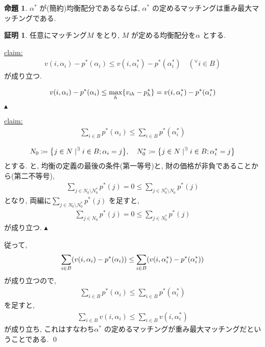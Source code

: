 \documentclass[10pt, fleqn, label-section=none]{bxjsarticle}
\theoremstyle{definition}
\newtheorem{prop}[dfn]{命題}
\newtheorem*{pf*}{証明}
\newcommand{\any}{{}^{\forall}}
\newcommand{\paren}[1]{\mleft( #1\mright )}
\newcommand{\cbra}[1]{\mleft\{#1\mright\}}
\renewcommand{\;}{\, ; \,}
\newenvironment{claim}[1]{\par\noindent\underline{claim:}\space#1}{}
\newenvironment{claimproof}[1]{\par\noindent{($\because$)}\space#1}{\hfill $\blacktriangle $}
\begin{document}
\begin{prop}$\alpha^*$ が(簡約)均衡配分であるならば, $\alpha^*$ の定めるマッチングは重み最大マッチングである. 

\end{prop}
\begin{pf*}
任意にマッチング$M$ をとり, $M$ が定める均衡配分を$\alpha $ とする. 
\begin{claim}
\begin{align*} v(i, \alpha_i) - p^* (\alpha_i)  \leq v(i, \alpha^*_i) - p^* (\alpha^* _i)  \quad (\any i \in B)  \end{align*}
が成り立つ. 
\end{claim}
\begin{claimproof}
\begin{align*} v(i, \alpha_i) - p^* (\alpha _i) \leq \max_h \cbra{v_{ih} - p^*_h } =  v(i, \alpha^*_i) - p^* (\alpha^* _i) \end{align*}
\end{claimproof}

\begin{claim}
\begin{align*} \sum_{i \in B} p^*(\alpha _i )   \leq  \sum_{i \in B} p^*(\alpha^* _i )  \end{align*}
\end{claim}

\begin{claimproof}
\begin{align*} N_0 \coloneqq \cbra{ j \in N \mid ^\exists i \in B ; \alpha_i = j } , \quad N^*_0 \coloneqq \cbra{ j \in N \mid ^\exists i \in B ; \alpha^*_i = j } \end{align*}
とする. と, 均衡の定義の最後の条件(第一等号)と, 財の価格が非負であることから(第二不等号), 
\begin{align*} \sum_{ j \in N_0 \setminus N^*_0 } p^* (j) = 0 \leq  \sum_{ j \in N^*_0 \setminus N_0 } p^* (j)  \end{align*}
となり, 両編に$\displaystyle \sum_{j \in N_0 \setminus N^*_0} p^* (j) $ を足すと, 
\begin{align*}   \sum_{ j \in N_0  } p^* (j) = 0 \leq  \sum_{ j \in N^*_0  } p^* (j)   \end{align*}
が成り立つ. 
\end{claimproof}

従って, 
\begin{align*} \sum_{i \in B} \paren{  v(i, \alpha_i) - p^* (\alpha _i)  }   \leq  \sum_{i \in B}  \paren{ v(i, \alpha^*_i) - p^* (\alpha^* _i)  }  \end{align*}
が成り立つので, 
\begin{align*} \sum_{i \in B} p^*(\alpha _i )   \leq  \sum_{i \in B} p^*(\alpha^* _i )  \end{align*}
を足すと, 
\begin{align*} \sum_{i \in B}   v(i, \alpha_i) \leq    \sum_{i \in B}   v(i, \alpha^*_i)  \end{align*}
が成り立ち, これはすなわち$\alpha^*$ の定めるマッチングが重み最大マッチングだということである. 
\qed
\end{pf*}
\end{document}
